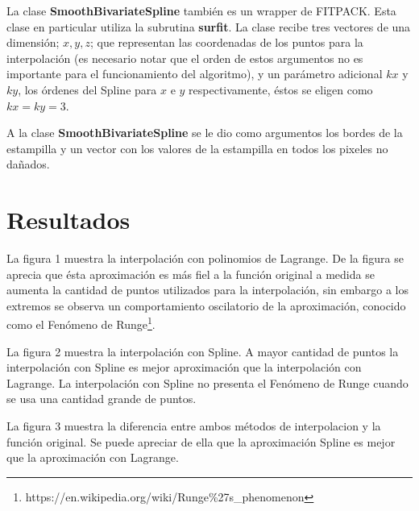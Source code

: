 \documentclass[a4paper, 11pt, spanish]{article}
\begin{document}
La clase \textbf{SmoothBivariateSpline} tambi\'en es un wrapper de FITPACK. Esta clase en particular utiliza la subrutina \textbf{surfit}. La clase recibe tres vectores de una dimensi\'on; $x, y, z$; que representan las coordenadas de los puntos para la interpolaci\'on (es necesario notar que el orden de estos argumentos no es importante para el funcionamiento del algoritmo), y un par\'ametro adicional $kx$ y $ky$, los \'ordenes del Spline para $x$ e $y$ respectivamente, \'estos se eligen como $kx = ky = 3$.

A la clase \textbf{SmoothBivariateSpline} se le dio como argumentos los bordes de la estampilla y un vector con los valores de la estampilla en todos los pixeles no da\~nados.

\section{Resultados}
La figura 1 muestra la interpolaci\'on con polinomios de Lagrange. De la figura se aprecia que \'esta aproximaci\'on es m\'as fiel a la funci\'on original a medida se aumenta la cantidad de puntos utilizados para la interpolaci\'on, sin embargo a los extremos se observa un comportamiento oscilatorio de la aproximaci\'on, conocido como el Fen\'omeno de Runge\footnote{https://en.wikipedia.org/wiki/Runge\%27s\_phenomenon}.

La figura 2 muestra la interpolaci\'on con Spline. A mayor cantidad de puntos la interpolaci\'on con Spline es mejor aproximaci\'on que la interpolaci\'on con Lagrange. La interpolaci\'on con Spline no presenta el Fen\'omeno de Runge cuando se usa una cantidad grande de puntos.

La figura 3 muestra la diferencia entre ambos m\'etodos de interpolacion y la funci\'on original. Se puede apreciar de ella que la aproximaci\'on Spline es mejor que la aproximaci\'on con Lagrange.
\end{document}
